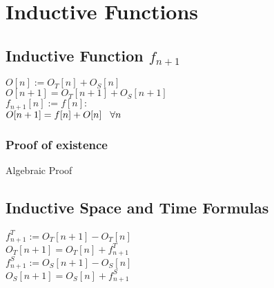 \documentclass[11pt]{article}
\begin{document}
\newpage
\section{Inductive Functions}














\subsection{Inductive Function $f_{n+1}$}
\begin{center}
\vspace{2mm}
$
O[n] := O_T[n] + O_S[n]
$
\\ \vspace{2mm}
$
O[n+1] = O_T[n+1] + O_S[n+1]
$
\\ \vspace{4mm}
$
f_{n+1}[n] := f[n] :
$
\\ \vspace{2mm}
$
O[n+1] = f[n] + O[n] \hspace{3mm} \forall n
$
\end{center}

\subsubsection{Proof of existence}
Algebraic Proof












\subsection{Inductive Space and Time Formulas}
\begin{center}
$
f^T_{n+1} := O_T[n+1] - O_T[n]
$
\\ \vspace{2mm}
$
O_T[n+1] = O_T[n] + f^T_{n+1}
$
\\ \vspace{2mm}
$
f^S_{n+1} := O_S[n+1] - O_S[n]
$
\\ \vspace{2mm}
$
O_S[n+1] = O_S[n] + f^S_{n+1}
$

\end{center}
\end{document}
